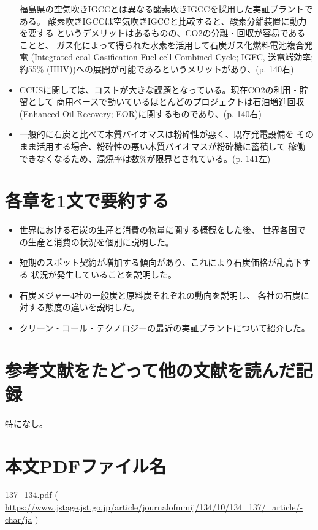 \documentclass[a4j]{jsarticle}
\begin{document}
\begin{itemize}
  福島県の空気吹きIGCCとは異なる酸素吹きIGCCを採用した実証プラントである。
  酸素吹きIGCCは空気吹きIGCCと比較すると、酸素分離装置に動力を要する
  というデメリットはあるものの、CO2の分離・回収が容易であることと、
  ガス化によって得られた水素を活用して石炭ガス化燃料電池複合発電
  (Integrated coal Gasification Fuel cell Combined Cycle; IGFC,
  送電端効率; 約55\% (HHV))への展開が可能であるというメリットがあり、(p. 140右)
\item
  CCUSに関しては、コストが大きな課題となっている。現在CO2の利用・貯留として
  商用ベースで動いているほとんどのプロジェクトは石油増進回収
  (Enhanced Oil Recovery; EOR)に関するものであり、(p. 140右)
\item
  一般的に石炭と比べて木質バイオマスは粉砕性が悪く、既存発電設備を
  そのまま活用する場合、粉砕性の悪い木質バイオマスが粉砕機に蓄積して
  稼働できなくなるため、混焼率は数\%が限界とされている。(p. 141左)
\end{itemize}


\section{各章を1文で要約する}
\begin{itemize}
\item
  世界における石炭の生産と消費の物量に関する概観をした後、
  世界各国での生産と消費の状況を個別に説明した。
\item
  短期のスポット契約が増加する傾向があり、これにより石炭価格が乱高下する
  状況が発生していることを説明した。
\item
  石炭メジャー4社の一般炭と原料炭それぞれの動向を説明し、
  各社の石炭に対する態度の違いを説明した。
\item
  クリーン・コール・テクノロジーの最近の実証プラントについて紹介した。
\end{itemize}


\section{参考文献をたどって他の文献を読んだ記録}
特になし。


\section{本文PDFファイル名}
137\_134.pdf
(
\url{https://www.jstage.jst.go.jp/article/journalofmmij/134/10/134_137/_article/-char/ja}
)


\end{document}
